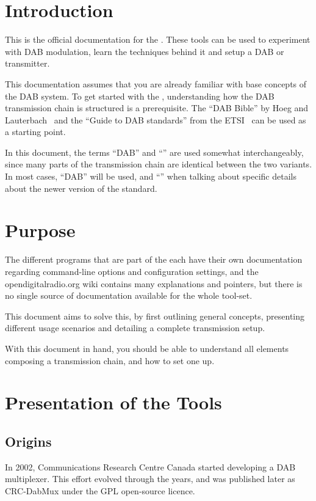 \section{Introduction}
This is the official documentation for the \mmbtools. These tools can be used to
experiment with DAB modulation, learn the techniques behind it and setup a DAB
or \dabplus transmitter.

This documentation assumes that you are already familiar with base concepts of
the DAB system. To get started with the \mmbtools, understanding how the DAB
transmission chain is structured is a prerequisite. The ``DAB Bible'' by Hoeg
and Lauterbach~\cite{hoeg} and the ``Guide to DAB standards'' from the
ETSI~\cite{etsidabguide} can be used as a starting point.

In this document, the terms ``DAB'' and ``\dabplus'' are used somewhat
interchangeably, since many parts of the transmission chain are identical
between the two variants. In most cases, ``DAB'' will be used, and ``\dabplus''
when talking about specific details about the newer version of the standard.


\section{Purpose}
The different programs that are part of the \mmbtools each have their own
documentation regarding command-line options and configuration settings, and the
opendigitalradio.org wiki
contains many explanations and pointers, but there is
no single source of documentation available for the whole tool-set.

This document aims to solve this, by first outlining general concepts,
presenting different usage scenarios and detailing a complete transmission
setup.

With this document in hand, you should be able to understand all elements
composing a \mmbtools transmission chain, and how to set one up.

\section{Presentation of the Tools}
\subsection{Origins}
In 2002, Communications Research Centre Canada
started developing a DAB multiplexer. This effort evolved through the years, and
was published later as \mbox{CRC-DabMux} under the GPL
open-source licence.

